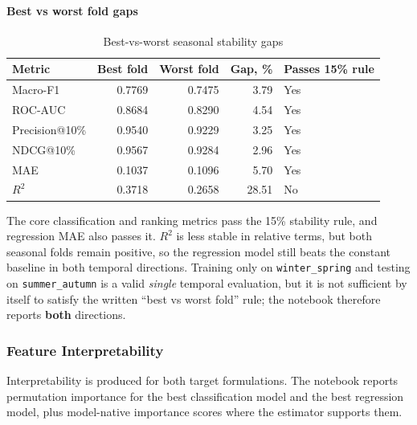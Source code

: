 \paragraph{Best vs worst fold gaps}
\begin{table}[H]
\centering
\begin{tabular}{lrrrl}
\hline
Metric & Best fold & Worst fold & Gap, \% & Passes 15\% rule \\
\hline
Macro-F1 & 0.7769 & 0.7475 & 3.79 & Yes \\
ROC-AUC & 0.8684 & 0.8290 & 4.54 & Yes \\
Precision@10\% & 0.9540 & 0.9229 & 3.25 & Yes \\
NDCG@10\% & 0.9567 & 0.9284 & 2.96 & Yes \\
MAE & 0.1037 & 0.1096 & 5.70 & Yes \\
$R^2$ & 0.3718 & 0.2658 & 28.51 & No \\
\hline
\end{tabular}
\caption{Best-vs-worst seasonal stability gaps}
\label{tab:modeling_stability_gaps}
\end{table}

The core classification and ranking metrics pass the 15\% stability rule, and regression MAE also passes it. $R^2$ is less stable in relative terms, but both seasonal folds remain positive, so the regression model still beats the constant baseline in both temporal directions. Training only on \texttt{winter\_spring} and testing on \texttt{summer\_autumn} is a valid \emph{single} temporal evaluation, but it is not sufficient by itself to satisfy the written ``best vs worst fold'' rule; the notebook therefore reports \textbf{both} directions.

\subsubsection{Feature Interpretability}

Interpretability is produced for both target formulations. The notebook reports permutation importance for the best classification model and the best regression model, plus model-native importance scores where the estimator supports them.

